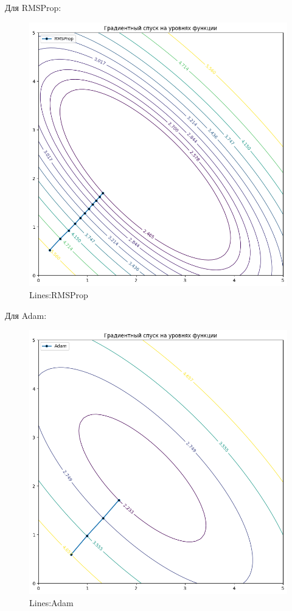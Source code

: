 \documentclass[12pt, a4paper, oneside, final]{article}
\begin{document}
	Для RMSProp:
	\begin{figure}[H]
		\centering
		\includegraphics[scale = 0.6]{Image/T5_LINES_RMSPROP.png}
		\caption*{Lines:RMSProp}
	\end{figure}
	Для Adam:
	\begin{figure}[H]
		\centering
		\includegraphics[scale = 0.6]{Image/T5_LINES_ADAM.png}
		\caption*{Lines:Adam}
	\end{figure}
	\newpage
\end{document}
